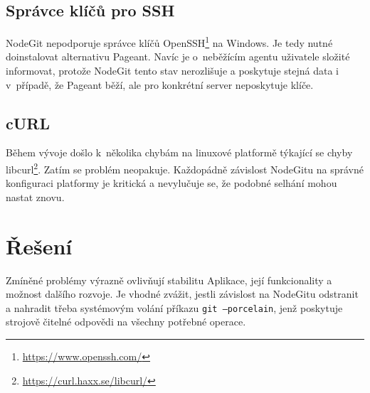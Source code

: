 \subsection{Správce klíčů pro SSH}

NodeGit nepodporuje správce klíčů OpenSSH\footnote{\url{https://www.openssh.com/}} na Windows. Je tedy nutné doinstalovat alternativu Pageant. Navíc je o~neběžícím agentu uživatele složité informovat, protože NodeGit tento stav nerozlišuje a poskytuje stejná data i v~případě, že Pageant běží, ale pro konkrétní server neposkytuje klíče.

\subsection{cURL}

Během vývoje došlo k~několika chybám na linuxové platformě týkající se chyby libcurl\footnote{\url{https://curl.haxx.se/libcurl/}}. Zatím se problém neopakuje. Každopádně závislost NodeGitu na správné konfiguraci platformy je kritická a nevylučuje se, že podobné selhání mohou nastat znovu.

\section{Řešení}

Zmíněné problémy výrazně ovlivňují stabilitu Aplikace, její funkcionality a možnost dalšího rozvoje. Je vhodné zvážit, jestli závislost na NodeGitu odstranit a nahradit třeba systémovým volání příkazu \texttt{git --porcelain}, jenž poskytuje strojově čitelné odpovědi na všechny potřebné operace.

